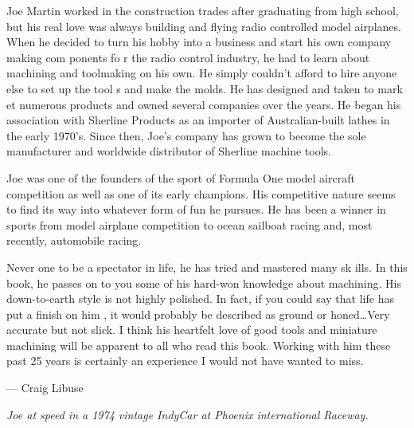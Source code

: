 \secdown
{}\secdown

Joe Martin worked in the construction trades after graduating from high school,
but his real love was always building and flying radio controlled model
airplanes. When he decided to turn his hobby into a business and start his own
company making com ponents fo r the radio control industry, he had to learn
about machining and toolmaking on his own. He simply couldn't afford to hire
anyone else to set up the tool s and make the molds. He has designed and taken
to mark et numerous products and owned several companies over the years. He
began his association with Sherline Products as an importer of Australian-built
lathes in the early 1970's. Since then, Joe's company has grown to become the
sole manufacturer and worldwide distributor of Sherline machine tools.

Joe was one of the founders of the sport of Formula One model aircraft
competition as well as one of its early champions. His competitive nature seems
to find its way into whatever form of fun he pursues. He has been a winner in
sports from model airplane competition to ocean sailboat racing and, most
recently, automobile racing.

Never one to be a spectator in life, he has tried and mastered many sk ills. In
this book, he passes on to you some of his hard-won knowledge about machining.
His down-to-earth style is not highly polished. In fact, if you could say that
life has put a finish on him , it would probably be described as ground or
honed\ldots Very accurate but not slick. I think his heartfelt love of good
tools and miniature machining will be apparent to all who read this book.
Working with him these past 25 years is certainly an experience I would not have
wanted to miss.

\bigskip
--- Craig Libuse

\bigskip
\textit{Joe at speed in a 1974 vintage IndyCar at Phoenix international
Raceway.}

\secup
\secup
